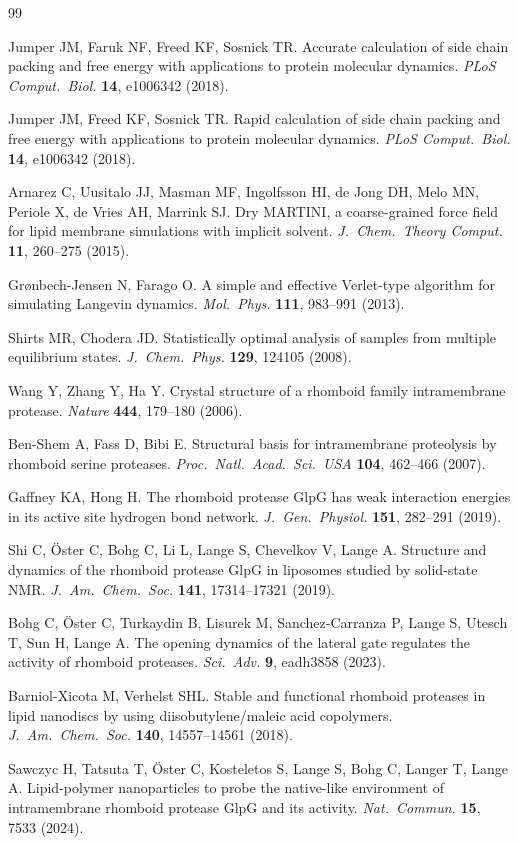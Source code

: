 \documentclass[journal=jctcce,manuscript=article,layout=twocolumn]{achemso}
\begin{document}
\begin{thebibliography}{99}

Jumper JM, Faruk NF, Freed KF, Sosnick TR.
Accurate calculation of side chain packing and free energy with applications to
protein molecular dynamics.
\emph{PLoS Comput.\ Biol.} \textbf{14}, e1006342 (2018).

Jumper JM, Freed KF, Sosnick TR.
Rapid calculation of side chain packing and free energy with applications to protein
molecular dynamics.
\emph{PLoS Comput.\ Biol.} \textbf{14}, e1006342 (2018).

Arnarez C, Uusitalo JJ, Masman MF, Ingolfsson HI, de Jong DH, Melo MN,
Periole X, de Vries AH, Marrink SJ.
Dry MARTINI, a coarse-grained force field for lipid membrane simulations with
implicit solvent.
\emph{J.\ Chem.\ Theory Comput.} \textbf{11}, 260--275 (2015).

Gr\o{}nbech-Jensen N, Farago O.
A simple and effective Verlet-type algorithm for simulating Langevin dynamics.
\emph{Mol.\ Phys.} \textbf{111}, 983--991 (2013).

Shirts MR, Chodera JD.
Statistically optimal analysis of samples from multiple equilibrium states.
\emph{J.\ Chem.\ Phys.} \textbf{129}, 124105 (2008).

Wang Y, Zhang Y, Ha Y.
Crystal structure of a rhomboid family intramembrane protease.
\emph{Nature} \textbf{444}, 179--180 (2006).

Ben-Shem A, Fass D, Bibi E.
Structural basis for intramembrane proteolysis by rhomboid serine proteases.
\emph{Proc.\ Natl.\ Acad.\ Sci.\ USA} \textbf{104}, 462--466 (2007).

Gaffney KA, Hong H.
The rhomboid protease GlpG has weak interaction energies in its active site hydrogen
bond network.
\emph{J.\ Gen.\ Physiol.} \textbf{151}, 282--291 (2019).

Shi C, \"{O}ster C, Bohg C, Li L, Lange S, Chevelkov V, Lange A.
Structure and dynamics of the rhomboid protease GlpG in liposomes studied by
solid-state NMR.
\emph{J.\ Am.\ Chem.\ Soc.} \textbf{141}, 17314--17321 (2019).

Bohg C, \"{O}ster C, Turkaydin B, Lisurek M, Sanchez-Carranza P, Lange S,
Utesch T, Sun H, Lange A.
The opening dynamics of the lateral gate regulates the activity of rhomboid
proteases.
\emph{Sci.\ Adv.} \textbf{9}, eadh3858 (2023).

Barniol-Xicota M, Verhelst SHL.
Stable and functional rhomboid proteases in lipid nanodiscs by using
diisobutylene/maleic acid copolymers.
\emph{J.\ Am.\ Chem.\ Soc.} \textbf{140}, 14557--14561 (2018).

Sawczyc H, Tatsuta T, \"{O}ster C, Kosteletos S, Lange S, Bohg C, Langer T, Lange A.
Lipid-polymer nanoparticles to probe the native-like environment of intramembrane
rhomboid protease GlpG and its activity.
\emph{Nat.\ Commun.} \textbf{15}, 7533 (2024).

\end{thebibliography}
\end{document}
